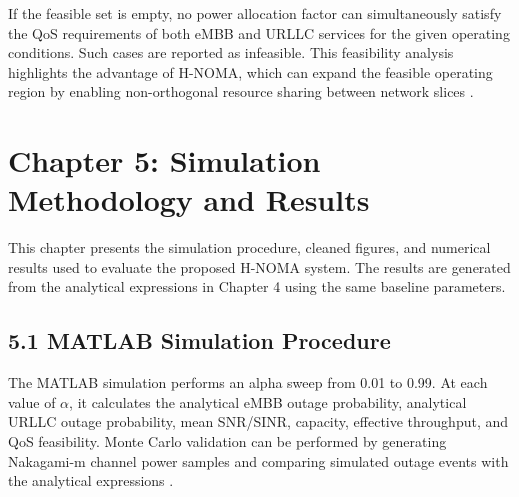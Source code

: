 \documentclass[
]{article}
\begin{document}
If the feasible set is empty, no power allocation factor can simultaneously satisfy the QoS requirements of both eMBB and URLLC services for the given operating conditions. Such cases are reported as infeasible. This feasibility analysis highlights the advantage of H-NOMA, which can expand the feasible operating region by enabling non-orthogonal resource sharing between network slices \parencite{Zhang2017}.

\clearpage

\section{Chapter 5: Simulation Methodology and
Results}\label{chapter-5-simulation-methodology-and-results}

This chapter presents the simulation procedure, cleaned figures, and
numerical results used to evaluate the proposed H-NOMA system. The
results are generated from the analytical expressions in Chapter 4 using
the same baseline parameters.

\subsection{5.1 MATLAB Simulation
Procedure}\label{matlab-simulation-procedure}

The MATLAB simulation performs an alpha sweep from 0.01 to 0.99. At each
value of \(α\), it calculates the analytical eMBB outage probability,
analytical URLLC outage probability, mean SNR/SINR, capacity, effective
throughput, and QoS feasibility. Monte Carlo validation can be performed
by generating Nakagami-m channel power samples and comparing simulated
outage events with the analytical expressions \parencite{3GPP22262}\parencite{3GPP28552}\parencite{3GPP38300}.
\end{document}
